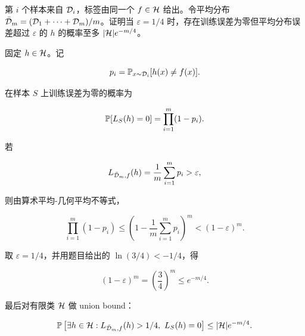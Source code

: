\begin{examproblem}
第 \(i\) 个样本来自 \(\mathcal{D}_i\)，标签由同一个 \(f\in\mathcal{H}\) 给出。令平均分布 \(\bar {\mathcal{D}}_m=(\mathcal{D}_1+\cdots+\mathcal{D}_m)/m\)。证明当 \(\varepsilon=1/4\) 时，存在训练误差为零但平均分布误差超过 \(\varepsilon\) 的 \(h\) 的概率至多 \(|\mathcal{H}|e^{-m/4}\)。
\end{examproblem}

\solution
固定 \(h\in\mathcal{H}\)。记

\[
  p_i=\mathbb{P}_{x\sim \mathcal{D}_i}[h(x)\ne f(x)].
\]

在样本 \(S\) 上训练误差为零的概率为

\[
  \mathbb{P}[L_S(h)=0]
  =
  \prod_{i=1}^{m}(1-p_i).
\]

若

\[
  L_{\bar {\mathcal{D}}_m,f}(h)
  =
  \frac1m\sum_{i=1}^{m}p_i
  >
  \varepsilon,
\]

则由算术平均-几何平均不等式，

\[
  \prod_{i=1}^{m}(1-p_i)
  \le
  \left(1-\frac1m\sum_{i=1}^{m}p_i\right)^m
  <
  (1-\varepsilon)^m.
\]

取 \(\varepsilon=1/4\)，并用题目给出的 \(\ln(3/4)<-1/4\)，得

\[
  (1-\varepsilon)^m
  =
  \left(\frac34\right)^m
  \le e^{-m/4}.
\]

最后对有限类 \(\mathcal{H}\) 做 union bound：

\[
  \mathbb{P}\left[
    \exists h\in\mathcal{H}:
    L_{\bar {\mathcal{D}}_m,f}(h)>1/4,\ L_S(h)=0
  \right]
  \le
  |\mathcal{H}|e^{-m/4}.
\]

